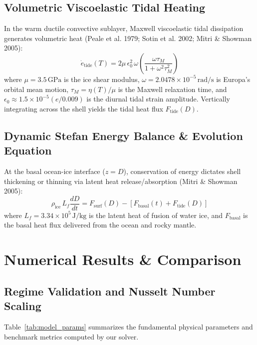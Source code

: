 \documentclass[11pt,a4paper]{article}
\begin{document}
\subsection{Volumetric Viscoelastic Tidal Heating}
In the warm ductile convective sublayer, Maxwell viscoelastic tidal dissipation generates volumetric heat (Peale et al. 1979; Sotin et al. 2002; Mitri \& Showman 2005):
\begin{equation}
\dot{e}_{\text{tide}}(T) = 2 \mu \, \epsilon_0^2 \, \omega \left( \frac{\omega \tau_M}{1 + \omega^2 \tau_M^2} \right)
\label{eq:e_tide}
\end{equation}
where $\mu = 3.5\,\text{GPa}$ is the ice shear modulus, $\omega = 2.0478 \times 10^{-5}\,\text{rad/s}$ is Europa's orbital mean motion, $\tau_M = \eta(T)/\mu$ is the Maxwell relaxation time, and $\epsilon_0 \approx 1.5 \times 10^{-5} (e / 0.009)$ is the diurnal tidal strain amplitude. Vertically integrating across the shell yields the tidal heat flux $F_{\text{tide}}(D)$.

\subsection{Dynamic Stefan Energy Balance \& Evolution Equation}
At the basal ocean-ice interface ($z = D$), conservation of energy dictates shell thickening or thinning via latent heat release/absorption (Mitri \& Showman 2005):
\begin{equation}
\rho_{\text{ice}} \, L_f \frac{dD}{dt} = F_{\text{surf}}(D) - \left[ F_{\text{basal}}(t) + F_{\text{tide}}(D) \right]
\label{eq:stefan}
\end{equation}
where $L_f = 3.34 \times 10^5\,\text{J/kg}$ is the latent heat of fusion of water ice, and $F_{\text{basal}}$ is the basal heat flux delivered from the ocean and rocky mantle.

\section{Numerical Results \& Comparison}

\subsection{Regime Validation and Nusselt Number Scaling}
Table~\ref{tab:model_params} summarizes the fundamental physical parameters and benchmark metrics computed by our solver.
\end{document}
